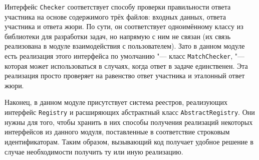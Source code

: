 Интерфейс \texttt{Checker} соответствует способу проверки правильности ответа участника на основе содержимого трёх файлов: входных данных, ответа участника и ответа жюри. По сути, он соответствует одноимённому классу из библиотеки для разработки задач, но напрямую с ним не связан (их связь реализована в модуле взаимодействия с пользователем). Зато в данном модуле есть реализация этого интерфейса по умолчанию "--- класс \texttt{MatchChecker}, "--- которая может использоваться в случаях, когда ответ в задаче единственен. Эта реализация просто проверяет на равенство ответ участника и эталонный ответ жюри.

Наконец, в данном модуле присутствует система реестров, реализующих интерфейс \texttt{Registry} и расширяющих абстрактный класс \texttt{AbstractRegistry}. Они нужны для того, чтобы хранить в них способы получения реализаций некоторых интерфейсов из данного модуля, поставленные в соответствие строковым идентификаторам. Таким образом, вызывающий код получает удобное решение в случае необходимости получить ту или иную реализацию.